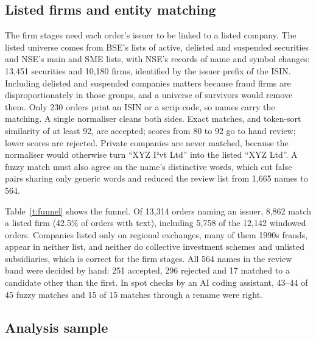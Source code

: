 \documentclass[letterpaper,11pt,leqno]{article}
\begin{document}
\subsection{Listed firms and entity matching}\label{s:matching}

The firm stages need each order's issuer to be linked to a listed company. The listed universe comes from BSE's lists of active, delisted and suspended securities and NSE's main and SME lists, with NSE's records of name and symbol changes: 13,451 securities and 10,180 firms, identified by the issuer prefix of the ISIN. Including delisted and suspended companies matters because fraud firms are disproportionately in those groups, and a universe of survivors would remove them. Only 230 orders print an ISIN or a scrip code, so names carry the matching. A single normaliser cleans both sides. Exact matches, and token-sort similarity of at least 92, are accepted; scores from 80 to 92 go to hand review; lower scores are rejected. Private companies are never matched, because the normaliser would otherwise turn ``XYZ Pvt Ltd'' into the listed ``XYZ Ltd''. A fuzzy match must also agree on the name's distinctive words, which cut false pairs sharing only generic words and reduced the review list from 1,665 names to 564.

Table~\ref{t:funnel} shows the funnel. Of 13,314 orders naming an issuer, 8,862 match a listed firm (42.5\% of orders with text), including 5,758 of the 12,142 windowed orders. Companies listed only on regional exchanges, many of them 1990s frauds, appear in neither list, and neither do collective investment schemes and unlisted subsidiaries, which is correct for the firm stages. All 564 names in the review band were decided by hand: 251 accepted, 296 rejected and 17 matched to a candidate other than the first. In spot checks by an AI coding assistant, 43--44 of 45 fuzzy matches and 15 of 15 matches through a rename were right.

\begin{table}[t]
\caption{From the corpus to the firm sample}

\label{t:funnel}\end{table}

\subsection{Analysis sample}\label{s:sample}
\end{document}
